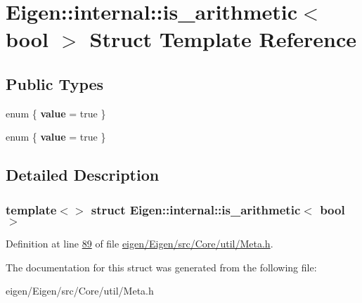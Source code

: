 \hypertarget{struct_eigen_1_1internal_1_1is__arithmetic_3_01bool_01_4}{}\section{Eigen\+:\+:internal\+:\+:is\+\_\+arithmetic$<$ bool $>$ Struct Template Reference}
\label{struct_eigen_1_1internal_1_1is__arithmetic_3_01bool_01_4}
\subsection*{Public Types}
\begin{DoxyCompactItemize}
\item 
\mbox{\label{struct_eigen_1_1internal_1_1is__arithmetic_3_01bool_01_4_ab926409dbb28bf271b84294c7a2eca72}} 
enum \{ {\bfseries value} = true
 \}
\item 
\mbox{\label{struct_eigen_1_1internal_1_1is__arithmetic_3_01bool_01_4_a2d1b0830e84bcf186e9c49429c27d722}} 
enum \{ {\bfseries value} = true
 \}
\end{DoxyCompactItemize}


\subsection{Detailed Description}
\subsubsection*{template$<$$>$\newline
struct Eigen\+::internal\+::is\+\_\+arithmetic$<$ bool $>$}



Definition at line \hyperlink{eigen_2_eigen_2src_2_core_2util_2_meta_8h_source_l00089}{89} of file \hyperlink{eigen_2_eigen_2src_2_core_2util_2_meta_8h_source}{eigen/\+Eigen/src/\+Core/util/\+Meta.\+h}.



The documentation for this struct was generated from the following file\+:\begin{DoxyCompactItemize}
\item 
eigen/\+Eigen/src/\+Core/util/\+Meta.\+h\end{DoxyCompactItemize}
